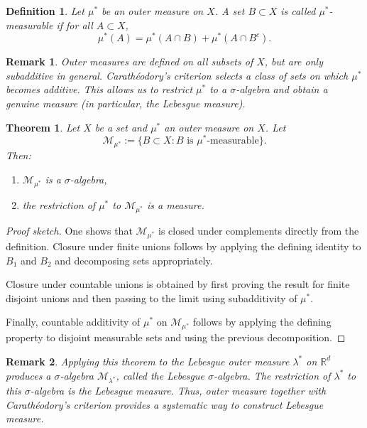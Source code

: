 \documentclass[12pt]{article}
\newtheorem{theorem}{Theorem}
\newtheorem{definition}{Definition}
\newtheorem{remark}{Remark}
\begin{document}
\begin{definition}
Let $\mu^*$ be an outer measure on $X$. A set $B \subset X$ is called
\emph{$\mu^*$-measurable} if for all $A \subset X$,
\[
\mu^*(A) = \mu^*(A \cap B) + \mu^*(A \cap B^c).
\]
\end{definition}

\begin{remark}
Outer measures are defined on all subsets of $X$, but are only
subadditive in general. Carathéodory’s criterion selects a class of
sets on which $\mu^*$ becomes additive. This allows us to restrict
$\mu^*$ to a $\sigma$-algebra and obtain a genuine measure (in
particular, the Lebesgue measure).
\end{remark}

\begin{theorem}
Let $X$ be a set and $\mu^*$ an outer measure on $X$. Let
\[
\mathcal{M}_{\mu^*} := \{ B \subset X : B \text{ is } \mu^*\text{-measurable} \}.
\]
Then:
\begin{enumerate}[label=(\alph*)]
    \item $\mathcal{M}_{\mu^*}$ is a $\sigma$-algebra,
    \item the restriction of $\mu^*$ to $\mathcal{M}_{\mu^*}$ is a measure.
\end{enumerate}
\end{theorem}

\begin{proof}[Proof sketch]
One shows that $\mathcal{M}_{\mu^*}$ is closed under complements directly from
the definition. Closure under finite unions follows by applying the defining
identity to $B_1$ and $B_2$ and decomposing sets appropriately.

Closure under countable unions is obtained by first proving the result for
finite disjoint unions and then passing to the limit using subadditivity of
$\mu^*$.

Finally, countable additivity of $\mu^*$ on $\mathcal{M}_{\mu^*}$ follows by
applying the defining property to disjoint measurable sets and using the
previous decomposition.
\end{proof}

\begin{remark}
Applying this theorem to the Lebesgue outer measure $\lambda^*$ on $\mathbb{R}^d$
produces a $\sigma$-algebra $\mathcal{M}_{\lambda^*}$, called the
\emph{Lebesgue $\sigma$-algebra}. The restriction of $\lambda^*$ to this
$\sigma$-algebra is the Lebesgue measure. Thus, outer measure together with
Carathéodory’s criterion provides a systematic way to construct Lebesgue measure.
\end{remark}
\end{document}
